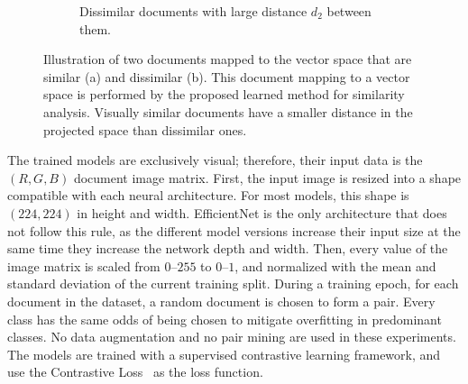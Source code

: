 \begin{figure}[ht!]
\begin{subfigure}[b]{0.99\textwidth}
        \caption{Dissimilar documents with large distance $d_2$ between them.}
        \label{fig:dissimilar_docs}
    \end{subfigure}
    \caption{Illustration of two documents mapped to the vector space that are similar (a) and dissimilar (b). This document mapping to a vector space is performed by the proposed learned method for similarity analysis. Visually similar documents have a smaller distance in the projected space than dissimilar ones.}
    \label{fig:vector_space_mapping}
\end{figure}

The trained models are exclusively visual; therefore, their input data is the $(R, G, B)$ document image matrix. First, the input image is resized into a shape compatible with each neural architecture. For most models, this shape is $(224, 224)$ in height and width. EfficientNet is the only architecture that does not follow this rule, as the different model versions increase their input size at the same time they increase the network depth and width. Then, every value of the image matrix is scaled from $0\text{--}255$ to $0\text{--}1$, and normalized with the mean and standard deviation of the current training split. During a training epoch, for each document in the dataset, a random document is chosen to form a pair. Every class has the same odds of being chosen to mitigate overfitting in predominant classes. No data augmentation and no pair mining are used in these experiments. The models are trained with a supervised contrastive learning framework, and use the Contrastive Loss~\cite{chopra_learning_2005} as the loss function.
